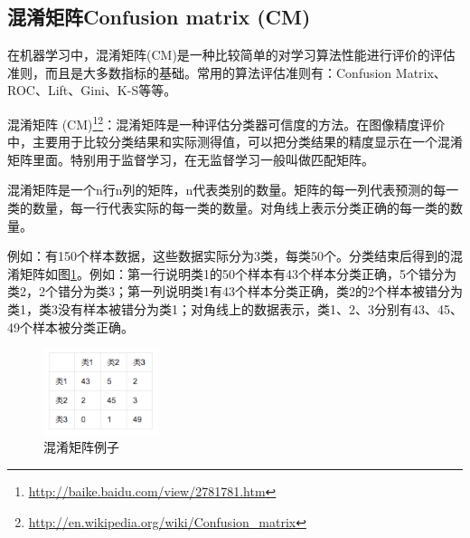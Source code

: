 \documentclass[12pt]{article}
\begin{document}
    



\subsection{混淆矩阵Confusion matrix (CM)}
\label{CM}

在机器学习中，混淆矩阵(CM)是一种比较简单的对学习算法性能进行评价的评估准则，而且是大多数指标的基础。常用的算法评估准则有：Confusion Matrix、ROC、Lift、Gini、K-S等等。\newline

混淆矩阵 (CM)\footnote{\url{http://baike.baidu.com/view/2781781.htm}}\footnote{\url{http://en.wikipedia.org/wiki/Confusion_matrix}}：混淆矩阵是一种评估分类器可信度的方法。在图像精度评价中，主要用于比较分类结果和实际测得值，可以把分类结果的精度显示在一个混淆矩阵里面。特别用于监督学习，在无监督学习一般叫做匹配矩阵。

混淆矩阵是一个n行n列的矩阵，n代表类别的数量。矩阵的每一列代表预测的每一类的数量，每一行代表实际的每一类的数量。对角线上表示分类正确的每一类的数量。

例如：有150个样本数据，这些数据实际分为3类，每类50个。分类结束后得到的混淆矩阵如图\ref{fig:cm}。例如：第一行说明类1的50个样本有43个样本分类正确，5个错分为类2，2个错分为类3；第一列说明类1有43个样本分类正确，类2的2个样本被错分为类1，类3没有样本被错分为类1；对角线上的数据表示，类1、2、3分别有43、45、49个样本被分类正确。\newline
    \begin{figure}[!ht]
      \centering 
        \includegraphics[width=0.3\textwidth]{cm}
        \caption{混淆矩阵例子}
        \label{fig:cm}
    \end{figure}
\end{document}
